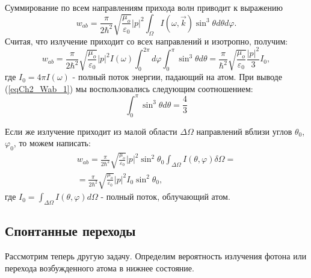 Суммирование по всем направлениям прихода волн приводит к выражению
\begin{equation}
w_{ab} = \frac{\pi}{2 \hbar^2}\sqrt{\frac{\mu_o}{\varepsilon_0}}
\left|p\right|^2
\int_{\Omega}I\left(\omega, \vec{k}\right)
\sin^3 \theta d \theta d \varphi.
\end{equation}
Считая, что излучение приходит со всех направлений и изотропно, 
получим: 
\begin{equation}
w_{ab} = \frac{\pi}{2 \hbar^2}\sqrt{\frac{\mu_o}{\varepsilon_0}}
\left|p\right|^2 I\left(\omega\right)
\int_{0}^{2 \pi}d \varphi \int_0^{\pi}
\sin^3 \theta d \theta = 
\frac{\pi}{ \hbar^2}\sqrt{\frac{\mu_o}{\varepsilon_0}}
\frac{\left|p\right|^2}{3}I_0,
\label{eqCh2_Wab_1}
\end{equation}
где $I_0 = 4 \pi I\left(\omega\right)$ - полный поток энергии,
падающий на атом. При выводе  (\ref{eqCh2_Wab_1})
мы воспользовались следующим соотношением:
\[
 \int_0^{\pi}
\sin^3 \theta d \theta = \frac{4}{3}
\]

Если же излучение приходит из малой области
$\Delta \Omega$ направлений вблизи углов $\theta_0$, $\varphi_0$, то 
можем написать:  
\begin{eqnarray}
w_{ab} = \frac{\pi}{2 \hbar^2}\sqrt{\frac{\mu_o}{\varepsilon_0}}
\left|p\right|^2 \sin^2 \theta_0
\int_{\Delta \Omega} I\left(\theta, \varphi\right)
\delta \Omega = 
\nonumber \\
= 
\frac{\pi}{2 \hbar^2}\sqrt{\frac{\mu_o}{\varepsilon_0}}
\left|p\right|^2  I_0 \sin^2 \theta_0,
\label{eqCh2_Wab_2}
\end{eqnarray}
где $I_0 = \int_{\Delta \Omega} I\left(\theta, \varphi\right)
d \Omega$ -  полный поток, облучающий атом.

\subsection{Спонтанные переходы}
Рассмотрим теперь другую задачу. Определим вероятность излучения
фотона или перехода возбужденного атома в нижнее состояние.  


